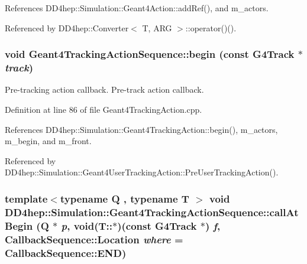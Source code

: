 References DD4hep::Simulation::Geant4Action::addRef(), and m\_\-actors.

Referenced by DD4hep::Converter$<$ T, ARG $>$::operator()().\hypertarget{class_d_d4hep_1_1_simulation_1_1_geant4_tracking_action_sequence_a21df8be5f0514bb4295fc2de9afe4eb2}{
\subsubsection[{begin}]{\setlength{\rightskip}{0pt plus 5cm}void Geant4TrackingActionSequence::begin (const G4Track $\ast$ {\em track})}}
\label{class_d_d4hep_1_1_simulation_1_1_geant4_tracking_action_sequence_a21df8be5f0514bb4295fc2de9afe4eb2}


Pre-\/tracking action callback. Pre-\/track action callback. 

Definition at line 86 of file Geant4TrackingAction.cpp.

References DD4hep::Simulation::Geant4TrackingAction::begin(), m\_\-actors, m\_\-begin, and m\_\-front.

Referenced by DD4hep::Simulation::Geant4UserTrackingAction::PreUserTrackingAction().\hypertarget{class_d_d4hep_1_1_simulation_1_1_geant4_tracking_action_sequence_a4e933ed9417657635b11034a9b7fa435}{
\subsubsection[{callAtBegin}]{\setlength{\rightskip}{0pt plus 5cm}template$<$typename Q , typename T $>$ void DD4hep::Simulation::Geant4TrackingActionSequence::callAtBegin (Q $\ast$ {\em p}, \/  void(T::$\ast$)(const G4Track $\ast$) {\em f}, \/  {\bf CallbackSequence::Location} {\em where} = {\ttfamily CallbackSequence::END})}}
\label{class_d_d4hep_1_1_simulation_1_1_geant4_tracking_action_sequence_a4e933ed9417657635b11034a9b7fa435}


